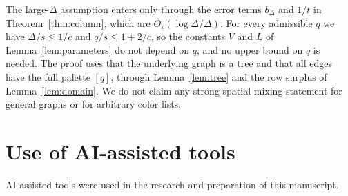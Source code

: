 \documentclass{amsart}
\numberwithin{equation}{section}
\theoremstyle{plain}
\theoremstyle{definition}
\theoremstyle{remark}
\begin{document}
The large-$\Delta$ assumption enters only through the error terms $b_\Delta$ and $1/t$ in Theorem~\ref{thm:column}, which are $O_\varepsilon(\log\Delta/\Delta)$. For every admissible $q$ we have $\Delta/s\le1/c$ and $q/s\le1+2/c$, so the constants $\bar V$ and $\bar L$ of Lemma~\ref{lem:parameters} do not depend on $q$, and no upper bound on $q$ is needed. The proof uses that the underlying graph is a tree and that all edges have the full palette $[q]$, through Lemma~\ref{lem:tree} and the row surplus of Lemma~\ref{lem:domain}. We do not claim any strong spatial mixing statement for general graphs or for arbitrary color lists.

\section*{Use of AI-assisted tools}

AI-assisted tools were used in the research and preparation of this manuscript.
\end{document}
